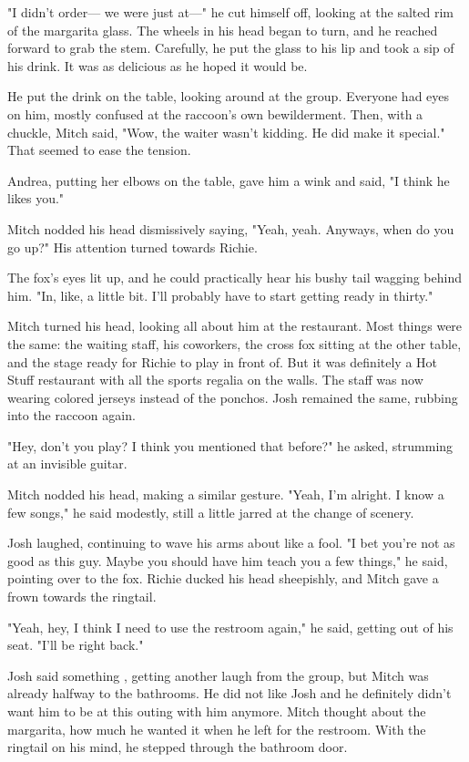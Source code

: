 "I didn't order--- we were just at---" he cut himself off, looking at the salted rim of the margarita glass. The wheels in his head began to turn, and he reached forward to grab the stem. Carefully, he put the glass to his lip and took a sip of his drink. It was as delicious as he hoped it would be.

He put the drink on the table, looking around at the group. Everyone had eyes on him, mostly confused at the raccoon's own bewilderment. Then, with a chuckle, Mitch said, "Wow, the waiter wasn't kidding. He did make it special." That seemed to ease the tension.

Andrea, putting her elbows on the table, gave him a wink and said, "I think he likes you."

Mitch nodded his head dismissively saying, "Yeah, yeah. Anyways, when do you go up?" His attention turned towards Richie.

The fox's eyes lit up, and he could practically hear his bushy tail wagging behind him. "In, like, a little bit. I'll probably have to start getting ready in thirty."

Mitch turned his head, looking all about him at the restaurant. Most things were the same: the waiting staff, his coworkers, the cross fox sitting at the other table, and the stage ready for Richie to play in front of. But it was definitely a Hot Stuff restaurant with all the sports regalia on the walls. The staff was now wearing colored jerseys instead of the ponchos. Josh remained the same, rubbing into the raccoon again.

"Hey, don't you play? I think you mentioned that before?" he asked, strumming at an invisible guitar.

Mitch nodded his head, making a similar gesture. "Yeah, I'm alright. I know a few songs," he said modestly, still a little jarred at the change of scenery.

Josh laughed, continuing to wave his arms about like a fool. "I bet you're not as good as this guy. Maybe you should have him teach you a few things," he said, pointing over to the fox. Richie ducked his head sheepishly, and Mitch gave a frown towards the ringtail.

"Yeah, hey, I think I need to use the restroom again," he said, getting out of his seat. "I'll be right back."

Josh said something , getting another laugh from the group, but Mitch was already halfway to the bathrooms. He did not like Josh and he definitely didn't want him to be at this outing with him anymore. Mitch thought about the margarita, how much he wanted it when he left for the restroom. With the ringtail on his mind, he stepped through the bathroom door.


